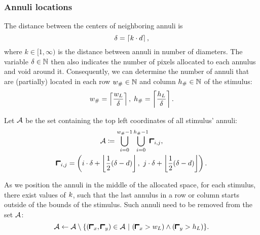\subsubsection{Annuli locations}
\label{sec:annuli-locations}

The distance between the centers of neighboring annuli is
\begin{equation}
    \delta = \left\lceil k \cdot d \right\rceil,
\end{equation}
where $k \in [1, \infty)$ is the distance between annuli in number of diameters.
The variable $\delta \in \mathbb{N}$ then also indicates the number of pixels allocated to each annulus and void around it. Consequently, we can determine the number of annuli that are (partially) located in each row $w_{\#} \in \mathbb{N}$ and column $h_{\#} \in \mathbb{N}$ of the stimulus:
\begin{equation}
    w_{\#} = \left\lceil \frac{w_L}{\delta} \right\rceil, \;
    h_{\#} = \left\lceil \frac{h_L}{\delta} \right\rceil. 
\end{equation}

Let $\mathcal{A}$ be the set containing the top left coordinates of all stimulus' annuli:
\begin{equation}
\begin{gathered}
    \annuliset  \coloneqq \bigcup_{i = 0}^{\repsinrow - 1} \bigcup_{i = 0}^{\repsincol - 1}
    \annstart_{i, j}, \\
    \annstart_{i, j} = \left( 
        i \cdot \anndist + \floor{ \frac{1}{2} (\anndist - \diam) }, \ 
        j \cdot \anndist + \floor{ \frac{1}{2} (\anndist - \diam) }
    \right).
\end{gathered}
\end{equation}

As we position the annuli in the middle of the allocated space, for each stimulus, there exist values of $k$, such that the last annulus in a row or column starts outside of the bounds of the stimulus. Such annuli need to be removed from the set $\mathcal{A}$:
\begin{equation}
    \annuliset \leftarrow \annuliset \setminus \{ (\annstart_x, \annstart_y) \in \annuliset \ | \ (\annstart_x > \fullwidth) \land (\annstart_y > \fullheight) \}.
\end{equation}
